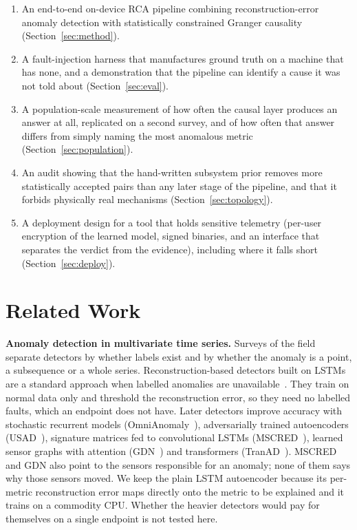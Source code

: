 \documentclass[conference]{IEEEtran}
\begin{document}
\begin{enumerate}
  \item An end-to-end on-device RCA pipeline combining reconstruction-error
        anomaly detection with statistically constrained Granger causality
        (Section~\ref{sec:method}).
  \item A fault-injection harness that manufactures ground truth on a machine
        that has none, and a demonstration that the pipeline can identify a
        cause it was not told about (Section~\ref{sec:eval}).
  \item A population-scale measurement of how often the causal layer produces
        an answer at all, replicated on a second survey, and of how often
        that answer differs from simply naming the most anomalous metric
        (Section~\ref{sec:population}).
  \item An audit showing that the hand-written subsystem prior removes more
        statistically accepted pairs than any later stage of the pipeline, and
        that it forbids physically real mechanisms
        (Section~\ref{sec:topology}).
  \item A deployment design for a tool that holds sensitive telemetry
        (per-user encryption of the learned model, signed binaries, and an
        interface that separates the verdict from the evidence), including
        where it falls short (Section~\ref{sec:deploy}).
\end{enumerate}

\section{Related Work}

\textbf{Anomaly detection in multivariate time series.} Surveys of the
field~\cite{chandola2009survey, blazquez2021review} separate detectors by
whether labels exist and by whether the anomaly is a point, a subsequence or a
whole series. Reconstruction-based detectors built on LSTMs~\cite{hochreiter1997lstm}
are a standard approach when labelled anomalies are
unavailable~\cite{malhotra2016lstm, hundman2018detecting}. They train on
normal data only and threshold the reconstruction error, so they need no
labelled faults, which an endpoint does not have. Later detectors improve
accuracy with stochastic recurrent models
(OmniAnomaly~\cite{su2019omni}), adversarially trained autoencoders
(USAD~\cite{audibert2020usad}), signature matrices fed to convolutional LSTMs
(MSCRED~\cite{zhang2019mscred}), learned sensor graphs with attention
(GDN~\cite{deng2021gdn}) and transformers (TranAD~\cite{tuli2022tranad}).
MSCRED and GDN also point to the sensors responsible for an anomaly; none of
them says why those sensors moved. We keep the plain LSTM autoencoder because
its per-metric reconstruction error maps directly onto the metric to be
explained and it trains on a commodity CPU. Whether the heavier detectors
would pay for themselves on a single endpoint is not tested here.
\end{document}
